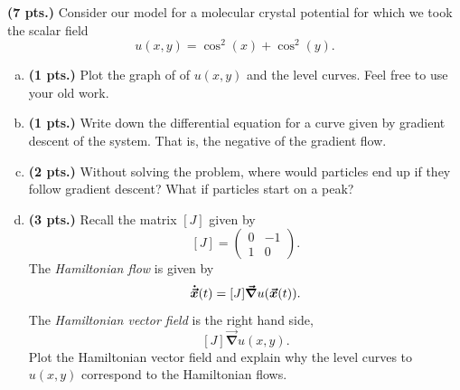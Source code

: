 \documentclass[12pt]{article} %
\newcommand{\grad}{\boldsymbol{\vec{\nabla}}}
\begin{document}
\newpage
\begin{problem}
\textbf{(7 pts.)} Consider our model for a molecular crystal potential for which we took the scalar field
\[
u(x,y)=\cos^2(x)+\cos^2(y).
\]
\begin{enumerate}[(a)]
\item \textbf{(1 pts.)} Plot the graph of of $u(x,y)$ and the level curves. Feel free to use your old work.
\item \textbf{(1 pts.)} Write down the differential equation for a curve given by gradient descent of the system. That is, the negative of the gradient flow. 
\item \textbf{(2 pts.)} Without solving the problem, where would particles end up if they follow gradient descent? What if particles start on a peak?
\item \textbf{(3 pts.)} Recall the matrix $[J]$ given by
\[
[J] = \begin{pmatrix} 0 & -1 \\ 1 & 0 \end{pmatrix}.
\]
The \emph{Hamiltonian flow} is given by
\[
\boldsymbol{\dot{\vec{x}}}(t) = [J] \grad u(\vecx(t)).
\]
The \emph{Hamiltonian vector field} is the right hand side,
\[
[J] \grad u(x,y).
\]
Plot the Hamiltonian vector field and explain why the level curves to $u(x,y)$ correspond to the Hamiltonian flows.
\end{enumerate}
\end{problem}
\end{document}
